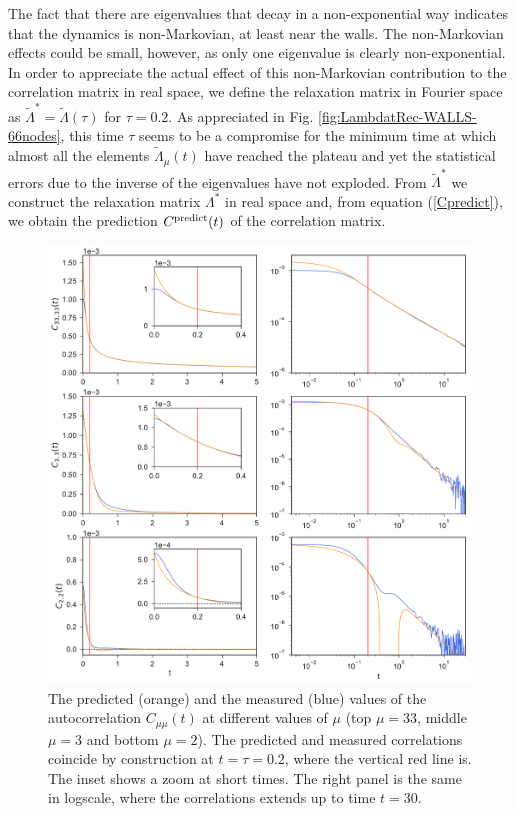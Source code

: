 \documentclass[b5paper,openright,10pt]{book}
\begin{document}
The fact  that there are  eigenvalues that decay in  a non-exponential
way indicates  that the dynamics  is non-Markovian, at least  near the
walls. The non-Markovian effects could  be small, however, as only one
eigenvalue  is clearly  non-exponential.  In  order to  appreciate the
actual effect  of this  non-Markovian contribution to  the correlation
matrix in real space, we define the relaxation matrix in Fourier space
as   $\tilde{\Lambda}^*=\tilde{\Lambda}(\tau)$  for   $\tau=0.2$.   As
appreciated in Fig.   \ref{fig:LambdatRec-WALLS-66nodes}, this time
$\tau$ seems to  be a compromise for the minimum  time at which almost
all the elements $\tilde{\Lambda}_\mu(t)$ have reached the plateau and
yet the statistical errors due to  the inverse of the eigenvalues have
not exploded.   From $\tilde{\Lambda}^*$  we construct  the relaxation
matrix $\Lambda^*$ in  real space and, from  equation  (\ref{Cpredict}), we
obtain the prediction $C^{\rm  predict}(t)$ of the correlation matrix.
\begin{figure}[h!]
  \centering
\includegraphics[width=\linewidth]{Predictions-WALLS-66nodes}
\caption[Predicted autocorrelations of $C(t)$ for a confined fluid - Thin bins]{The predicted (orange) and the measured (blue) values of the autocorrelation $C_{\mu\mu}(t)$ at different values of $\mu$ (top $\mu=33$, middle $\mu=3$ and bottom $\mu=2$). The predicted and measured correlations coincide by construction at $t=\tau=0.2$, where the vertical red line is. The inset shows a zoom at short times. The right panel is the same in logscale, where the correlations extends up to time $t=30$.}
\label{fig:Predictions-WALLS-66nodes}
\end{figure}
\end{document}
